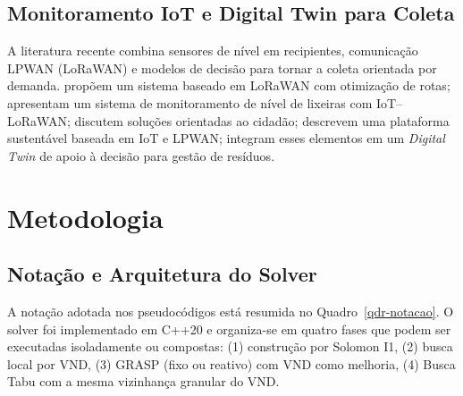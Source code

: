 \documentclass[10pt, a4paper]{article}
\begin{document}
\subsection{Monitoramento IoT e Digital Twin para Coleta}

A literatura recente combina sensores de n\'ivel em recipientes, comunica\c{c}\~ao LPWAN (LoRaWAN) e modelos de decis\~ao para tornar a coleta orientada por demanda. \citet{lozano2018} prop\~oem um sistema baseado em LoRaWAN com otimiza\c{c}\~ao de rotas; \citet{ramson2021} apresentam um sistema de monitoramento de n\'ivel de lixeiras com IoT--LoRaWAN; \citet{pardini2020} discutem solu\c{c}\~oes orientadas ao cidad\~ao; \citet{almeida2021} descrevem uma plataforma sustent\'avel baseada em IoT e LPWAN; \citet{barth2023} integram esses elementos em um \emph{Digital Twin} de apoio \`a decis\~ao para gest\~ao de res\'iduos.

\section{Metodologia}
\label{sec-metodologia}

\subsection{Nota\c{c}\~ao e Arquitetura do Solver}
\label{sec-arquitetura}

A nota\c{c}\~ao adotada nos pseudoc\'odigos est\'a resumida no Quadro~\ref{qdr-notacao}. O solver foi implementado em C++20 e organiza-se em quatro fases que podem ser executadas isoladamente ou compostas: (1) constru\c{c}\~ao por Solomon I1, (2) busca local por VND, (3) GRASP (fixo ou reativo) com VND como melhoria, (4) Busca Tabu com a mesma vizinhan\c{c}a granular do VND.
\end{document}
